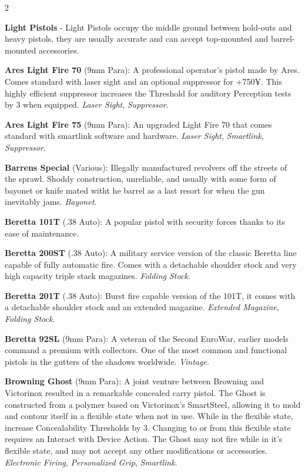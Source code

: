 \documentclass[
  oneside]{article}
\begin{document}
\begin{multicols}{2}

\textbf{Light Pistols} - Light Pistols occupy the
middle ground between hold-outs and heavy pistols,
they are usually accurate and can accept
top-mounted and barrel-mounted accessories.

\textbf{Ares Light Fire 70} (9mm Para): A
professional operator's pistol made by Ares. Comes
standard with laser sight and an optional
suppressor for +750¥. This highly efficient
suppressor increases the Threshold for auditory
Perception tests by 3 when equipped. \emph{Laser
Sight}, \emph{Suppressor}.

\textbf{Ares Light Fire 75} (9mm Para): An
upgraded Light Fire 70 that comes standard with
smartlink software and hardware. \emph{Laser
Sight}, \emph{Smartlink}, \emph{Suppressor}.

\textbf{Barrens Special} (Various): Illegally
manufactured revolvers off the streets of the
sprawl. Shoddy construction, unreliable, and
usually with some form of bayonet or knife mated
witht he barrel as a last resort for when the gun
inevitably jams. \emph{Bayonet}.

\textbf{Beretta 101T} (.38 Auto): A popular pistol
with security forces thanks to its ease of
maintenance.

\textbf{Beretta 200ST} (.38 Auto): A military
service version of the classic Beretta line
capable of fully automatic fire. Comes with a
detachable shoulder stock and very high capacity
triple stack magazines. \emph{Folding Stock}.

\textbf{Beretta 201T} (.38 Auto): Burst fire
capable version of the 101T, it comes with a
detachable shoulder stock and an extended
magazine. \emph{Extended Magazine}, \emph{Folding
Stock}.

\textbf{Beretta 92SL} (9mm Para): A veteran of the
Second EuroWar, earlier models command a premium
with collectors. One of the most common and
functional pistols in the gutters of the shadows
worldwide. \emph{Vintage}.

\textbf{Browning Ghost} (9mm Para): A joint
venture between Browning and Victorinox resulted
in a remarkable concealed carry pistol. The Ghost
is constructed from a polymer based on
Victorinox's SmartSteel, allowing it to mold and
contour itself in a flexible state when not in
use. While in the flexible state, increase
Concealability Thresholds by 3. Changing to or
from this flexible state requires an Interact with
Device Action. The Ghost may not fire while in
it's flexible state, and may not accept any other
modifications or accessories. \emph{Electronic
Firing}, \emph{Personalized Grip},
\emph{Smartlink}.


\end{multicols}
\end{document}
